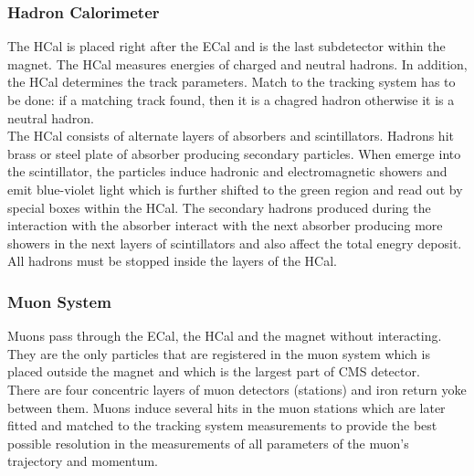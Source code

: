 
\subsubsection{Hadron Calorimeter}

The HCal is placed right after the ECal and is the last subdetector within the magnet. The HCal measures energies of charged and neutral hadrons. In addition, the HCal determines the track parameters. Match to the tracking system has to be done: if a matching track found, then it is a chagred hadron otherwise it is a neutral hadron. \\

The HCal consists of alternate layers of absorbers and scintillators. Hadrons hit brass or steel plate of absorber producing secondary particles. When emerge into the scintillator, the particles induce hadronic and electromagnetic showers and emit blue-violet light which is further shifted to the green region and read out by special boxes within the HCal. The secondary hadrons produced during the interaction with the absorber interact with the next absorber producing more showers in the next layers of scintillators and also affect the total enegry deposit. All hadrons must be stopped inside the layers of the HCal.\\


\subsubsection{Muon System}

Muons pass through the ECal, the HCal and the magnet without interacting. They are the only particles that are registered in the muon system which is placed outside the magnet and which is the largest part of CMS detector.\\

There are four concentric layers of muon detectors (stations) and iron return yoke between them. Muons induce several hits in the muon stations which are later fitted and matched to the tracking system measurements to provide the best possible resolution in the measurements of all parameters of the muon's trajectory and momentum.\\

